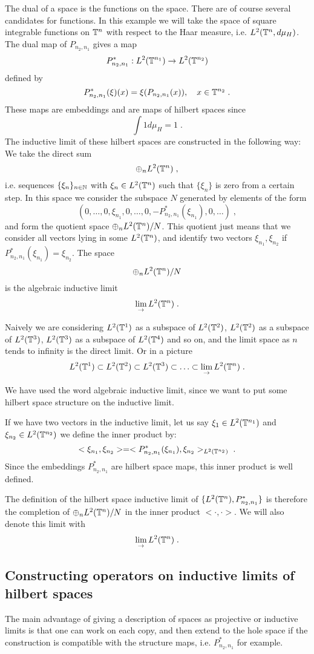 \documentclass[12pt]{article}
\newcommand{\bbN}{{\Bbb N}}
\newcommand{\bbT}{{\Bbb T}}
\begin{document}
The dual of a space is the functions on the space. There are of course several candidates for functions. In this example we will take the space of square integrable functions on $\bbT^n$ with respect to the Haar measure, i.e. $L^2 (\bbT^n,d\mu_H)$. The dual map of $P_{n_2,n_1}$ gives a map
$$P_{n_2,n_1}^*:L^2(\bbT^{n_1})\to L^2(\bbT^{n_2})$$ 
 defined by
$$P_{n_2,n_1}^* (\xi )(x)=\xi(P_{n_2,n_1}(x )), \quad x\in \bbT^{n_2}\;.$$
These maps are embeddings and are maps of hilbert spaces since 
$$\int 1 d\mu_H=1\;.$$
The inductive limit of these hilbert spaces are constructed in the following way: We take the direct sum 
$$\oplus_n L^2(\bbT^n)\;,$$
i.e. sequences $\{\xi_n\}_{n\in \bbN}$ with $\xi_n\in L^2(\bbT^n)$ such that 
$\{\xi_n\}$ is zero from a certain step. In this space we consider the subspace $N$ generated by elements of the form
$$(0,\ldots ,0, \xi_{n_1},0,\ldots,0,-P_{n_2,n_1}^* (\xi_{n_1}) ,0,\ldots)\;,$$
and form the quotient space $\oplus_n L^2(\bbT^n)/N$. This quotient just means that we consider all vectors lying in some $L^2(\bbT^n)$, and identify two vectors $\xi_{n_1}, \xi_{n_2}$ if $P_{n_2,n_1}^*(\xi_{n_1})=\xi_{n_2}$. The space 
$$\oplus_n L^2(\bbT^n)/N$$
is the algebraic inductive limit 
$$\lim_{\to}L^2(\bbT^n)\;.$$

Naively we are considering $L^2(\bbT^1)$ as a subspace of $L^2(\bbT^2)$, $L^2(\bbT^2)$ as a subspace of $L^2(\bbT^3)$, $L^2(\bbT^3)$ as a subspace of $L^2(\bbT^4)$ and so on, and the limit space as $n$ tends to infinity is the direct limit. Or in a picture
$$L^2(\bbT^1 )\subset L^2(\bbT^2)\subset L^2(\bbT^3 )\subset \ldots \subset
\lim_\to L^2(\bbT^n)\;.$$

We have used the word algebraic inductive limit, since we want to put some hilbert space structure on the inductive limit. 

If we have two vectors in the inductive limit, let us say $\xi_1\in L^2(\bbT^{n_1})$ and $\xi_{n_2}\in L^2(\bbT^{n_2})$ we define the inner product by:
$$<\xi_{n_1},\xi_{n_2}>=<P_{n_2,n_1}^*(\xi_{n_1}),\xi_{n_2}>_{L^2(\bbT^{n_2})}\;.$$
Since the embeddings $P_{n_2,n_1}^*$ are hilbert space maps, this inner product is well defined.

The definition of the hilbert space inductive limit of $\{L^2(\bbT^n), P_{n_2,n_1}^*\}$ is therefore the completion of $\oplus_nL^2(\bbT^n)/N$ in the inner product $<\cdot , \cdot >$. We will also denote this limit with
$$\lim_{\to}L^2(\bbT^n)\;.$$

\subsection{Constructing operators on inductive limits of hilbert spaces}
The main advantage of giving a description of spaces as projective or inductive limits is that one can work on each copy, and then extend to the hole space if the construction is compatible with the structure maps, i.e. $P_{n_2,n_1}^*$ for example. 
\end{document}

